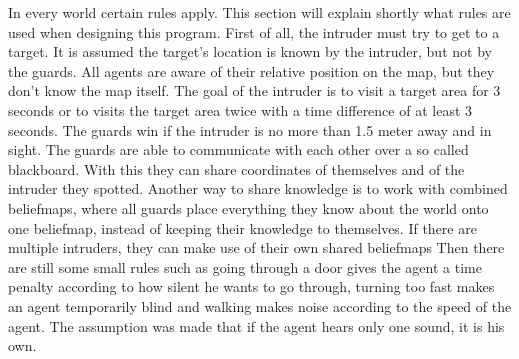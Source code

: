     In every world certain rules apply. This section will explain shortly what rules are used when designing this program. First of all, the intruder must try to get to a target. It is assumed the target's location is known by the intruder, but not by the guards. All agents are aware of their relative position on the map, but they don't know the map itself.
    The goal of the intruder is to visit a target area for 3 seconds or to visits the target area twice with a time difference of at least 3 seconds. The guards win if the intruder is no more than 1.5 meter away and in sight.
	The guards are able to communicate with each other over a so called blackboard. With this they can share coordinates of themselves and of the intruder they spotted. Another way to share knowledge is to work with combined beliefmaps, where all guards place everything they know about the world onto one beliefmap, instead of keeping their knowledge to themselves. If there are multiple intruders, they can make use of their own shared beliefmaps
	Then there are still some small rules such as going through a door gives the agent a time penalty according to how silent he wants to go through, turning too fast makes an agent temporarily blind and walking makes noise according to the speed of the agent. The assumption was made that if the agent hears only one sound, it is his own.
	
